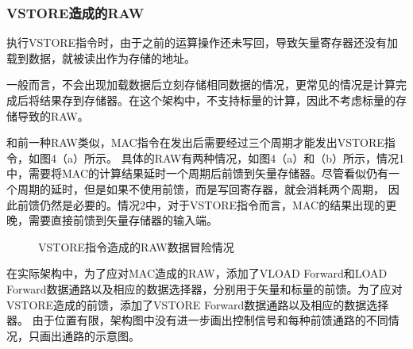 \documentclass[UTF8]{ctexart}
\begin{document}
\subsubsection{VSTORE造成的RAW}
执行VSTORE指令时，由于之前的运算操作还未写回，导致矢量寄存器还没有加载到数据，就被读出作为存储的地址。

一般而言，不会出现加载数据后立刻存储相同数据的情况，更常见的情况是计算完成后将结果存到存储器。在这个架构中，不支持标量的计算，因此不考虑标量的存储导致的RAW。

和前一种RAW类似，MAC指令在发出后需要经过三个周期才能发出VSTORE指令，如图4（a）所示。
具体的RAW有两种情况，如图4（a）和（b）所示，情况1中，需要将MAC的计算结果延时一个周期后前馈到矢量存储器。尽管看似仍有一个周期的延时，但是如果不使用前馈，而是写回寄存器，就会消耗两个周期，
因此前馈仍然是必要的。情况2中，对于VSTORE指令而言，MAC的结果出现的更晚，需要直接前馈到矢量存储器的输入端。

\begin{figure}[htbp]
    \centering
    \caption{VSTORE指令造成的RAW数据冒险情况}
    \label{Fig.main}
\end{figure}

在实际架构中，为了应对MAC造成的RAW，添加了VLOAD Forward和LOAD Forward数据通路以及相应的数据选择器，分别用于矢量和标量的前馈。为了应对VSTORE造成的前馈，添加了VSTORE Forward数据通路以及相应的数据选择器。
由于位置有限，架构图中没有进一步画出控制信号和每种前馈通路的不同情况，只画出通路的示意图。
\end{document}
